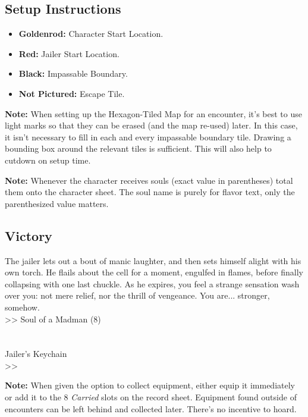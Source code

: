 \subsection*{Setup Instructions}
\begin{itemize}
\item \textbf{Goldenrod:} Character Start Location.
\item \textbf{Red:} Jailer Start Location.
\item \textbf{Black:} Impassable Boundary.
\item \textbf{Not Pictured:} Escape Tile.
\end{itemize}

\begin{tcolorbox}
\textbf{Note:} When setting up the Hexagon-Tiled Map for an encounter, it’s best to use light marks so that they can be erased (and the map re-used) later. In this case, it isn’t necessary to fill in each and every impassable boundary tile. Drawing a bounding box around the relevant tiles is sufficient. This will also help to cutdown on setup time.
\end{tcolorbox}

\pagebreak

\begin{tcolorbox}
\textbf{Note:} Whenever the character receives souls (exact value in parentheses) total them onto the character sheet. The soul name is purely for flavor text, only the parenthesized value matters.
\end{tcolorbox}

\subsection*{Victory}
The jailer lets out a bout of manic laughter, and then sets himself alight with his own torch. He flails about the cell for a moment, engulfed in flames, before finally collapsing with one last chuckle. As he expires, you feel a strange sensation wash over you: not mere relief, nor the thrill of vengeance. You are... stronger, somehow.\\
>> Soul of a Madman (8)\\
\\
\\
 Jailer’s Keychain\\
>> 

\begin{tcolorbox}
\textbf{Note:} When given the option to collect equipment, either equip it immediately or add it to the 8 \emph{Carried} slots on the record sheet. Equipment found outside of encounters can be left behind and collected later. There’s no incentive to hoard.
\end{tcolorbox}

